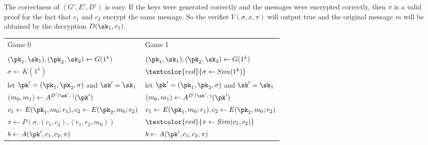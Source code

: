     The correctness of $(G',E',D')$ is easy. If the keys were generated correctly and the
    messages were encrypted correctly, then $\pi$ is a valid proof for the fact that
    $c_1$ and $c_2$ encrypt the same message. So the verifier $V(\sigma,x,\pi)$ will
    output true and the original message $m$ will be obtained by the decryption $D(\sk_1,c_1)$.

    \begin{table}[t!]
        \centering
        \begin{tabular}{l|l}
            Game 0                                                                                &
            Game 1                                                                                  \\
                                                                                                  & \\
            $(\pk_1,\sk_1),(\pk_2,\sk_2) \leftarrow G(1^k)$                                       &
            $(\pk_1,\sk_1),(\pk_2,\sk_2) \leftarrow G(1^k)$                                         \\
            $\sigma \leftarrow {K(1^k)}$                                                          &
            $\textcolor{red}{\sigma \leftarrow {Sim(1^k)}}$                                         \\
            let $\pk'=(\pk_1,\pk_2,\sigma)$ and $\sk'={\sk_1}$                                    &
            let $\pk'=(\pk_1,\pk_2,\sigma)$ and $\sk'={\sk_1}$                                      \\
            $(m_0,m_1) \leftarrow A^{D'(\sk',\cdot)}(\pk')$                                       &
            $(m_0,m_1) \leftarrow A^{D'(\sk',\cdot)}(\pk')$                                         \\
            $c_1 \leftarrow E(\pk_1,{m_0};r_1), c_2 \leftarrow E(\pk_2,{m_0};r_2)$                &
            $c_1 \leftarrow E(\pk_1,{m_0};r_1), c_2 \leftarrow E(\pk_2,{m_0};r_2)$                  \\
            $\pi \leftarrow {P(\sigma,(c_1,c_2),(r_1,r_2,{m_0}))}$                                &
            $\textcolor{red}{\pi \leftarrow {Sim(c_1,c_2)}}$                                        \\
            $b \leftarrow A(\pk',c_1,c_2,\pi)$                                                    &
            $b \leftarrow A(\pk',c_1,c_2,\pi)$                                                      \\

\end{tabular}
\end{table}
